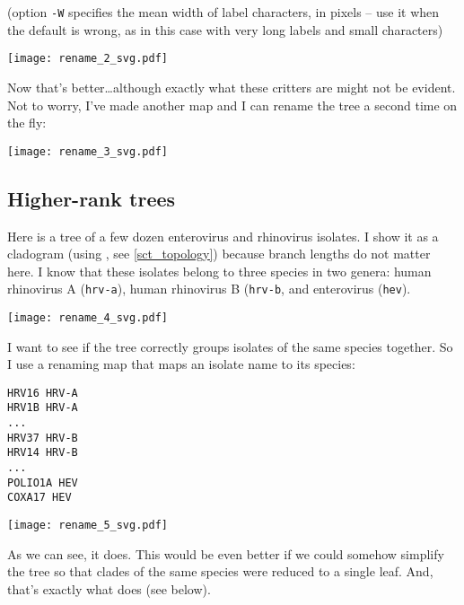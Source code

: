 
(option \texttt{-W} specifies the mean width of label characters, in
pixels -- use it when the default is wrong, as in this case with very long
labels and small characters)
\begin{center}
\texttt{[image: rename\_2\_svg.pdf]}
\end{center}

\noindent{}Now that's better\ldots although exactly what these critters are
might not be evident. Not to worry, I've made another map and I can rename the
tree a second time on the fly:


\begin{center}
\texttt{[image: rename\_3\_svg.pdf]}
\end{center}

\subsection{Higher-rank trees}
\label{sct_higher_rank}

Here is a tree of a few dozen enterovirus and rhinovirus isolates. I show it as
a cladogram (using \topology, see \ref{sct_topology}) because branch lengths do
not matter here. I know that these isolates belong to three species in two
genera: human rhinovirus A (\texttt{hrv-a}), human rhinovirus B
(\texttt{hrv-b}, and enterovirus (\texttt{hev}). 


\begin{center}
\texttt{[image: rename\_4\_svg.pdf]}
\end{center}

\noindent{}I want to see if the tree correctly groups isolates of the same
species together. So I use a renaming map that maps an isolate name to its
species:
\begin{verbatim}
HRV16 HRV-A
HRV1B HRV-A
...
HRV37 HRV-B
HRV14 HRV-B
...
POLIO1A HEV
COXA17 HEV
\end{verbatim}


\begin{center}
\texttt{[image: rename\_5\_svg.pdf]}
\end{center}

\noindent{}As we can see, it does. This would be even better if we could
somehow simplify the tree so that clades of the same species were reduced to a
single leaf. And, that's exactly what \condense{} does (see below).

